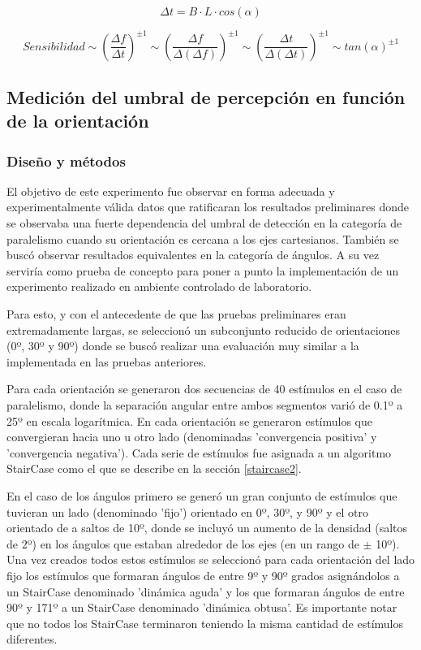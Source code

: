\documentclass{article}
\numberwithin{figure}{section}
\begin{document}
    \begin{equation} \label{ec:DeltaT}
        \Delta t = B \cdot L \cdot cos (\alpha)
    \end{equation}
    
    \begin{equation} \label{ec:Final}
        Sensibilidad \sim (\frac{\Delta f}{\Delta t })^{\pm 1} \sim (\frac{\Delta f}{\Delta (\Delta f) })^{\pm 1} \sim (\frac{\Delta t}{\Delta (\Delta t) })^{\pm 1} \sim tan(\alpha)^{\pm 1}
    \end{equation}
    

    \subsection{Medición del umbral de percepción en función de la orientación} \label{seccion:Exp1}
    
    \subsubsection{Diseño y métodos}
    
    El objetivo de este experimento fue observar en forma adecuada y experimentalmente válida datos que ratificaran los resultados preliminares donde se observaba una fuerte dependencia del umbral de detección en la categoría de paralelismo cuando su orientación es cercana a los ejes cartesianos. También se buscó observar resultados equivalentes en la categoría de ángulos. A su vez serviría como prueba de concepto para poner a punto la implementación de un experimento realizado en ambiente controlado de laboratorio.
    
    Para esto, y con el antecedente de que las pruebas preliminares eran extremadamente largas, se seleccionó un subconjunto reducido de orientaciones (0º, 30º y 90º) donde se buscó realizar una evaluación muy similar a la implementada en las pruebas anteriores. 
    
    Para cada orientación se generaron dos secuencias de 40 estímulos en el caso de paralelismo, donde la separación angular entre ambos segmentos varió de 0.1º a 25º en escala logarítmica. En cada orientación se generaron estímulos que convergieran hacia uno u otro lado (denominadas 'convergencia positiva' y 'convergencia negativa'). Cada serie de estímulos fue asignada a un algoritmo StairCase como el que se describe en la sección \ref{staircase2}. 
    
    En el caso de los ángulos primero se generó un gran conjunto de estímulos que tuvieran un lado (denominado 'fijo') orientado en 0º, 30º, y 90º y el otro orientado de a saltos de 10º, donde se incluyó un aumento de la densidad (saltos de 2º) en los ángulos que estaban alrededor de los ejes (en un rango de $\pm$ 10º). Una vez creados todos estos estímulos se seleccionó para cada orientación del lado fijo los estímulos que formaran ángulos de entre 9º y 90º grados asignándolos a un StairCase denominado 'dinámica aguda' y los que formaran ángulos de entre 90º y 171º a un StairCase denominado 'dinámica obtusa'. Es importante notar que no todos los StairCase terminaron teniendo la misma cantidad de estímulos diferentes.
    
\end{document}
